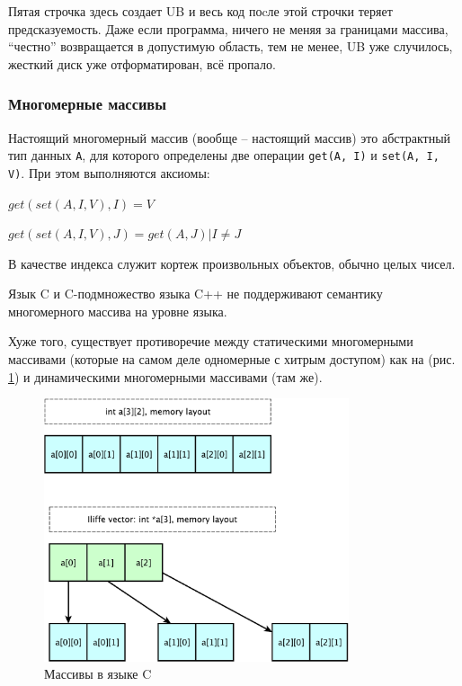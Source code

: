 \documentclass[a4paper,12pt,oneside]{article}
\begin{document}
Пятая строчка здесь создает UB и весь код поcле этой строчки теряет предсказуемость. Даже если программа, ничего не меняя за границами массива, ``честно'' возвращается в допустимую область, тем не менее, UB уже случилось, жесткий диск уже отформатирован, всё пропало.

\subsubsection{Многомерные массивы}\label{MultiDimArr}

Настоящий многомерный массив (вообще -- настоящий массив) это абстрактный тип данных \lstinline!A!, для которого определены две операции \lstinline!get(A, I)! и \lstinline!set(A, I, V)!. При этом выполняются аксиомы:

$get(set(A,I,V),I)=V$

$get(set(A,I,V),J)=get(A,J)|I \neq J$

В качестве индекса служит кортеж произвольных объектов, обычно целых чисел.

Язык C и C-подмножество языка C++ не поддерживают семантику многомерного массива на уровне языка.

Хуже того, существует противоречие между статическими многомерными массивами (которые на самом деле одномерные с хитрым доступом) как на (рис. \ref{fig:c_arrays}) и динамическими многомерными массивами (там же).

\begin{figure}[h!]
\centering
\includegraphics[width=0.8\textwidth]{illustrations/arraylayout-crop.pdf}
\caption{Массивы в языке C}
\label{fig:c_arrays}
\end{figure}
\end{document}
